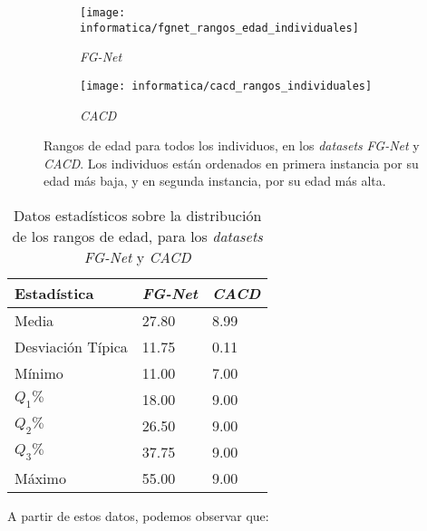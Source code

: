 \begin{figure}
\centering
    \begin{subfigure}{.5\textwidth}
        \centering
        \texttt{[image: informatica/fgnet\_rangos\_edad\_individuales]}
        \caption{\textit{FG-Net}}
    \end{subfigure}%
    \begin{subfigure}{.5\textwidth}
        \centering
        \texttt{[image: informatica/cacd\_rangos\_individuales]}
        \caption{\textit{CACD}}
    \end{subfigure}
\caption{Rangos de edad para todos los individuos, en los \textit{datasets} \textit{FG-Net} y \textit{CACD}. Los individuos están ordenados en primera instancia por su edad más baja, y en segunda instancia, por su edad más alta.}
\label{img:conjunta_fgnet_rangos_edades_individuales}
\end{figure}

\begin{table}[H]
\centering
\begin{tabular}{|l|l|l|}
    \hline
    \textbf{Estadística} & \textbf{\textit{FG-Net}} & \textbf{\textit{CACD}} \\
    \hline

    Media             & 27.80 & 8.99 \\
    Desviación Típica & 11.75 & 0.11 \\
    Mínimo            & 11.00 & 7.00 \\
    $Q_1 \%$          & 18.00 & 9.00 \\
    $Q_2 \%$          & 26.50 & 9.00 \\
    $Q_3 \%$          & 37.75 & 9.00 \\
    Máximo            & 55.00 & 9.00 \\

    \hline

\end{tabular}
\caption{Datos estadísticos sobre la distribución de los rangos de edad, para los \textit{datasets} \textit{FG-Net} y \textit{CACD}}
    \label{table:conjunta_fgnet_estadisticas_rangos_edad}
\end{table}

A partir de estos datos, podemos observar que:

